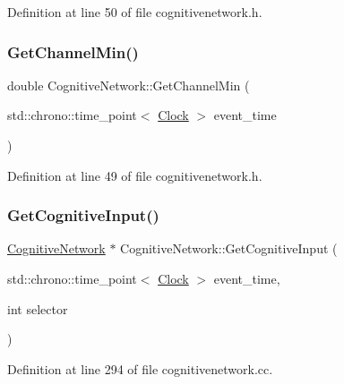 Definition at line 50 of file cognitivenetwork.\+h.

\mbox{\label{class_cognitive_network_ad7f5cc836340017d38c22b57e177fc91}} 
\subsubsection{\texorpdfstring{Get\+Channel\+Min()}{GetChannelMin()}}
{\footnotesize\ttfamily double Cognitive\+Network\+::\+Get\+Channel\+Min (\begin{DoxyParamCaption}\item[{std\+::chrono\+::time\+\_\+point$<$ \mbox{\hyperlink{universe_8h_a0ef8d951d1ca5ab3cfaf7ab4c7a6fd80}{Clock}} $>$}]{event\+\_\+time }\end{DoxyParamCaption})\hspace{0.3cm}{\ttfamily [inline]}}



Definition at line 49 of file cognitivenetwork.\+h.

\mbox{\label{class_cognitive_network_a2ff68a0d11cdb29af2f05a69a11911a4}} 
\subsubsection{\texorpdfstring{Get\+Cognitive\+Input()}{GetCognitiveInput()}}
{\footnotesize\ttfamily \mbox{\hyperlink{class_cognitive_network}{Cognitive\+Network}} $\ast$ Cognitive\+Network\+::\+Get\+Cognitive\+Input (\begin{DoxyParamCaption}\item[{std\+::chrono\+::time\+\_\+point$<$ \mbox{\hyperlink{universe_8h_a0ef8d951d1ca5ab3cfaf7ab4c7a6fd80}{Clock}} $>$}]{event\+\_\+time,  }\item[{int}]{selector }\end{DoxyParamCaption})}



Definition at line 294 of file cognitivenetwork.\+cc.

\mbox{\label{class_cognitive_network_a92b896643b881e4030401e0f7fd256bf}} 
